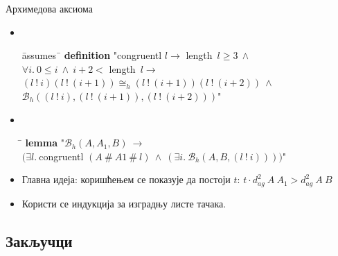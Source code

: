 \documentclass[slidestop, compress, mathserif, containsverbatim, xcolor=dvipsnames]{beamer}
\newcommand{\agsqdist}[2]{\ensuremath{d^2_{ag}\ #1\ #2}}
\renewcommand{\beth}[3]{\ensuremath{\mathcal{B}_h(#1, #2, #3)}}
\newcommand{\congrh}[4]{\ensuremath{#1#2 \cong_h #3#4}}
\begin{document}
\begin{frame}{Архимедова аксиома}
  \begin{center}
    
  \end{center}
  \begin{itemize}
  \item \begin{footnotesize} {\tt
    \begin{tabbing}
      \hspace{5mm}\=assumes\ \=\kill
      {\bf definition} "{}congruentl $l \longrightarrow$ length\ $l \ge 3\ \wedge$\\
    \>\>  $\forall i.\ 0 \le i\ \wedge\ i+2 <$ length\ $l \longrightarrow$ \\
    \>\>  $\congrh{(l\ !\ i)}{(l\ !\ (i+1))}{(l\ !\ (i+1))}{(l\ !\ (i+2))}\ \wedge $\\
    \>\>  $\beth{(l\ !\ i)}{(l\ !\ (i+1))}{(l\ !\ (i+2))}$"
    \end{tabbing}
    } \end{footnotesize}
    \item \begin{footnotesize} {\tt
      \begin{tabbing}
        \hspace{5mm}\=\kill
        {\bf lemma} "$\beth{A}{A_1}{B}\ \longrightarrow$\\
      \> $(\exists l.\ $congruentl $(A\ \#\ A1\ \#\ l)\ \wedge\ (\exists i.\ \beth{A}{B}{(l\ !\ i)}))$"
      \end{tabbing}
      } \end{footnotesize}
    \item Главна идеја: коришћењем  се показује да постоји $t$:
        $t\cdot \agsqdist{A}{A_1} > \agsqdist{A}{B}$
    \item Користи се индукција за изградњу листе тачака.
  \end{itemize}
\end{frame}

\subsection*{Закључци}
\end{document}
